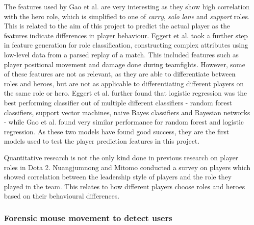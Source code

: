 \documentclass[Report.tex]{subfiles}
\begin{document}
The features used by Gao et al. are very interesting as they show high correlation with the hero role, which is simplified to one of \textit{carry}, \textit{solo lane} and \textit{support} roles. This is related to the aim of this project to predict the actual player as the features indicate differences in player behaviour. Eggert et al. \cite{dota-eggert} took a further step in feature generation for role classification, constructing complex attributes using low-level data from a parsed replay of a match. This included features such as player positional movement and damage done during teamfights. However, some of these features are not as relevant, as they are able to differentiate between roles and heroes, but are not as applicable to differentiating different players on the same role or hero. Eggert et al. \cite{dota-eggert} further found that logistic regression was the best performing classifier out of multiple different classifiers - random forest classifiers, support vector machines, naive Bayes classifiers and Bayesian networks - while Gao et al. \cite{dota-gao} found very similar performance for random forest and logistic regression. As these two models have found good success, they are the first models used to test the player prediction features in this project. 

Quantitative research is not the only kind done in previous research on player roles in Dota 2. Nuangjumnong and Mitomo \cite{dota-leadership} conducted a survey on players which showed correlation between the leadership style of players and the role they played in the team. This relates to how different players choose roles and heroes based on their behavioural differences. 


\subsubsection{Forensic mouse movement to detect users}
\end{document}
